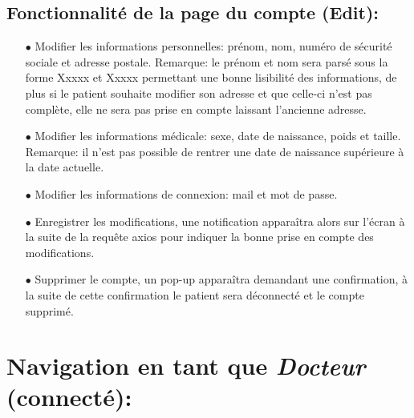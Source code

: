 \documentclass[a4paper]{report}
\begin{document}
\subsection{Fonctionnalité de la page du compte (Edit):}\label{edit}
    \begin{itemize}
        \item[$\bullet$] Modifier les informations personnelles: prénom, nom, numéro de sécurité sociale et adresse postale. {\fontsize{8}{14}\selectfont Remarque: le prénom et nom sera parsé sous la forme Xxxxx et Xxxxx permettant une bonne lisibilité des informations, de plus si le patient souhaite modifier son adresse et que celle-ci n'est pas complète, elle ne sera pas prise en compte laissant l’ancienne adresse.}
        \item[$\bullet$] Modifier les informations médicale: sexe, date de naissance, poids et taille. {\fontsize{8}{14}\selectfont Remarque: il n’est pas possible de rentrer une date de naissance supérieure à la date actuelle}.
        \item[$\bullet$] Modifier les informations de connexion: mail et mot de passe.
        \item[$\bullet$] Enregistrer les modifications, une notification apparaîtra alors sur l'écran à la suite de la requête axios pour indiquer la bonne prise en compte des modifications.
        \item[$\bullet$] Supprimer le compte, un pop-up apparaîtra demandant une confirmation, à la suite de cette confirmation le patient sera déconnecté et le compte supprimé.
    \end{itemize}

\vspace{1.5cm}

\section{{\noindent Navigation en tant que \textit{Docteur} {\fontsize{12}{16}\selectfont(connecté)}: }}
\vspace{0.6cm}
\end{document}
